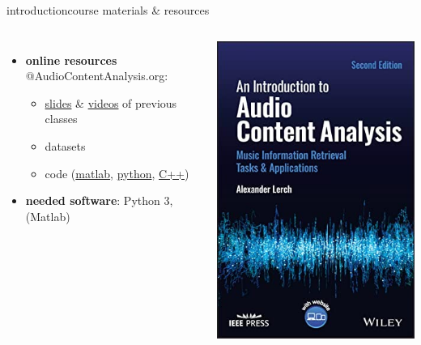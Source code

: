 \begin{frame}{introduction}{course materials \& resources}
\begin{columns}[T]
\begin{itemize}
                        \smallskip
                        \item<3->   \textbf{online resources} @AudioContentAnalysis.org: 
                            \begin{itemize}
                                \item   \href{https://github.com/alexanderlerch/ACA-Slides}{slides} \& \href{https://www.AudioContentAnalysis.org/class}{videos} of previous classes
                                \item   datasets
                                \item   code (\href{https://github.com/alexanderlerch/ACA-Code}{matlab}, \href{https://github.com/alexanderlerch/pyACA}{python}, \href{https://github.com/alexanderlerch/libACA}{C++})
                            \end{itemize}
                        \smallskip
                        \item<4->   \textbf{needed software}: Python 3, (Matlab)
                    \end{itemize}
                     \href{\IEEELink}{\includegraphics[scale=.25]{graph/cover_aca_v2}}
                    \vspace{40mm}
             \end{columns}
       \end{frame}

